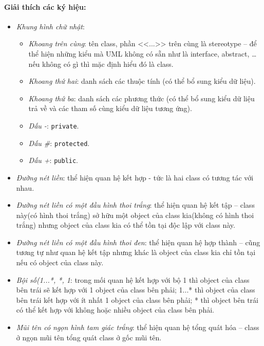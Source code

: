 \documentclass{article}
\begin{document}
  \paragraph{\textnormal{Giải thích các ký hiệu:}}
  
  \begin{itemize}
    \item \textit{Khung hình chữ nhật}:
      \begin{itemize}
        \item \textit{Khoang trên cùng}: tên class, phần <<...>> trên cùng là stereotype -- để thể hiện những kiểu mà UML không có sẵn như là interface, abstract, \ldots nếu không có gì thì mặc định hiểu đó là class.
        \item \textit{Khoang thứ hai}: danh sách các thuộc tính (có thể bổ sung kiểu dữ liệu).
        \item \textit{Khoang thứ ba}: danh sách các phương thức (có thể bổ sung kiểu dữ liệu trả về và các tham số cùng kiểu dữ liệu tương ứng).
        \item \textit{Dấu -}: \texttt{private}.
        \item \textit{Dấu \#}: \texttt{protected}.
        \item \textit{Dấu +}: \texttt{public}.
      \end{itemize}
      \item \textit{Đường nét liền}: thể hiện quan hệ kết hợp - tức là hai class có tương tác với nhau.
      \item \textit{Đường nét liền có một đầu hình thoi trắng}: thể hiện quan hệ kết tập -- class này(có hình thoi trắng) sở hữu một object của class kia(không có hình thoi trắng) nhưng object của class kia có thể tồn tại độc lập với class này.
      \item \textit{Đường nét liền có một đầu hình thoi đen}: thể hiện quan hệ hợp thành -- cũng tương tự như quan hệ kết tập nhưng khác là object của class kia chỉ tồn tại nếu có object của class này.
      \item \textit{Bội số(1...*, *, 1}: trong mối quan hệ kết hợp với bộ 1 thì object của class bên trái sẽ kết hợp với 1 object của class bên phải; 1...* thì object của class bên trái kết hợp với ít nhất 1 object của class bên phải; * thì object bên trái có thể kết hợp với không hoặc nhiều object của class bên phải.
      \item  \textit{Mũi tên có ngọn hình tam giác trắng}: thể hiện quan hệ tổng quát hóa -- class ở ngọn mũi tên tổng quát class ở gốc mũi tên.
  \end{itemize}
\end{document}
